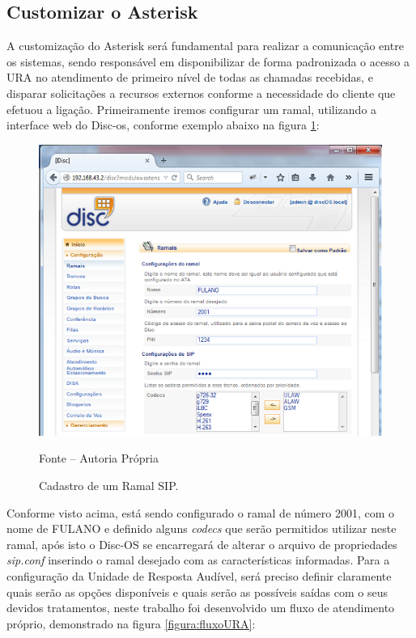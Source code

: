 \subsection{Customizar o Asterisk}

A customização do Asterisk será fundamental para realizar a comunicação entre os sistemas, sendo responsável em disponibilizar de forma padronizada o acesso a URA no atendimento de primeiro nível de todas as chamadas recebidas, e disparar solicitações a recursos externos conforme a necessidade do cliente que efetuou a ligação.
Primeiramente iremos configurar um ramal, utilizando a interface web do Disc-os, conforme exemplo abaixo na figura \ref{figura:cadastroRamapSIP}:


\begin{figure}[!htb]
	\centering
	\includegraphics{figuras/cadastro_ramal_sip.png}
	\caption{Cadastro de um Ramal SIP.}	
	\label{figura:cadastroRamapSIP}
	Fonte – Autoria Própria
\end{figure}


Conforme visto acima, está sendo configurado o ramal de número 2001, com o nome de FULANO e definido alguns \textit{codecs} que serão permitidos utilizar neste ramal, após isto o Disc-OS se encarregará de alterar o arquivo de propriedades \textit{sip.conf} inserindo o ramal desejado com as características informadas.
Para a configuração da Unidade de Resposta Audível, será preciso definir claramente quais serão as opções disponíveis e quais serão as possíveis saídas com o seus devidos tratamentos, neste trabalho foi desenvolvido um fluxo de atendimento próprio, demonstrado na figura \ref{figura:fluxoURA}: 

